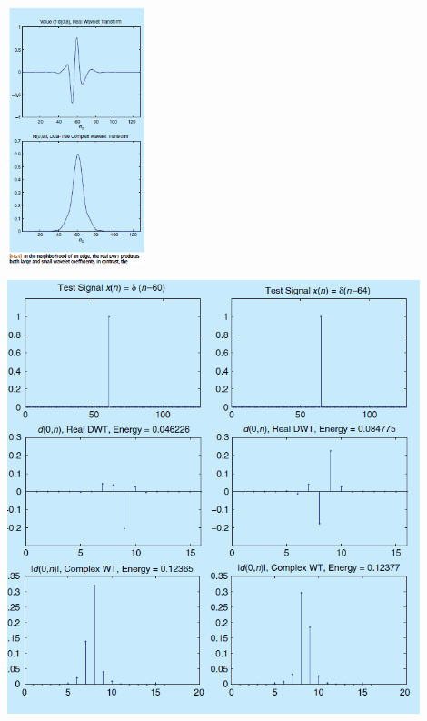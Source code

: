 \documentclass[11pt]{article} %
\begin{document}
\includegraphics[width=0.3\textwidth]{realvscomplex}

\includegraphics[width=0.9\textwidth]{coefstab}
\end{document}
